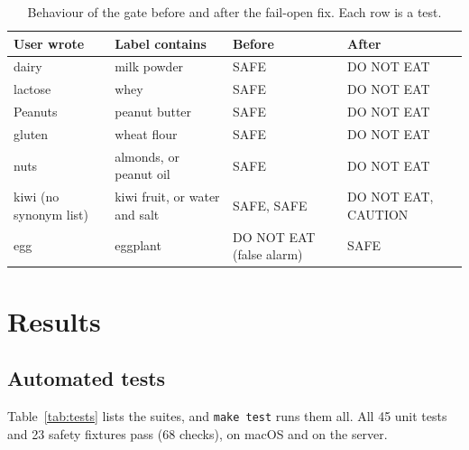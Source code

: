 \documentclass[11pt,a4paper]{article}
\begin{document}
\begin{table}[H]
\centering\small
\caption{Behaviour of the gate before and after the fail-open fix. Each row is a test.}
\label{tab:failopen}
\begin{tabularx}{\textwidth}{@{}l Y l l@{}}
\toprule
User wrote & Label contains & Before & After \\
\midrule
dairy & milk powder & SAFE & DO NOT EAT \\
lactose & whey & SAFE & DO NOT EAT \\
Peanuts & peanut butter & SAFE & DO NOT EAT \\
gluten & wheat flour & SAFE & DO NOT EAT \\
nuts & almonds, or peanut oil & SAFE & DO NOT EAT \\
kiwi (no synonym list) & kiwi fruit, or water and salt & SAFE, SAFE & DO NOT EAT, CAUTION \\
egg & eggplant & DO NOT EAT (false alarm) & SAFE \\
\bottomrule
\end{tabularx}
\end{table}

\section{Results}\label{sec:results}

\subsection{Automated tests}

Table~\ref{tab:tests} lists the suites, and \texttt{make test} runs them all. All 45 unit tests and 23
safety fixtures pass (68 checks), on macOS and on the server.
\end{document}
